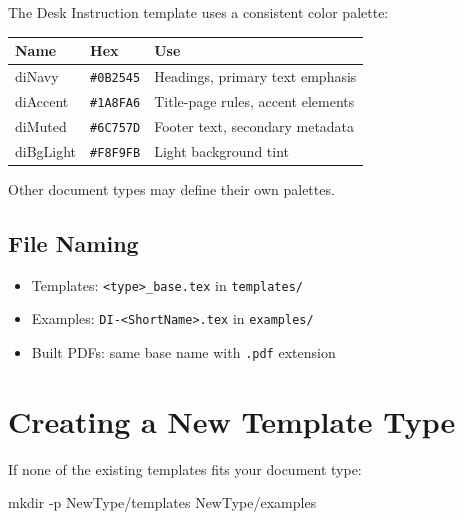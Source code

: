 {The Desk Instruction template uses a consistent color palette:

\begin{center}
\begin{tabular}{@{}l l l@{}}
\toprule
\textbf{Name} & \textbf{Hex} & \textbf{Use} \\
\midrule
diNavy    & \texttt{\#0B2545} & Headings, primary text emphasis \\
diAccent  & \texttt{\#1A8FA6} & Title-page rules, accent elements \\
diMuted   & \texttt{\#6C757D} & Footer text, secondary metadata \\
diBgLight & \texttt{\#F8F9FB} & Light background tint \\
\bottomrule
\end{tabular}
\end{center}

Other document types may define their own palettes.

\subsection{File Naming}

\begin{itemize}
\item Templates: \texttt{<type>\_base.tex} in \texttt{templates/}
\item Examples: \texttt{DI-<ShortName>.tex} in \texttt{examples/}
\item Built PDFs: same base name with \texttt{.pdf} extension
\end{itemize}

\section{Creating a New Template Type}
\label{sec:new-template}

If none of the existing templates fits your document type:

\begin{enumerate}
\par\vspace{4pt}\noindent\colorbox{diBgLight}{\begin{minipage}{\dimexpr\linewidth-12pt\relax}\small\ttfamily
mkdir -p NewType/templates NewType/examples\\
\end{minipage}}\par\vspace{4pt}



\end{enumerate}}
